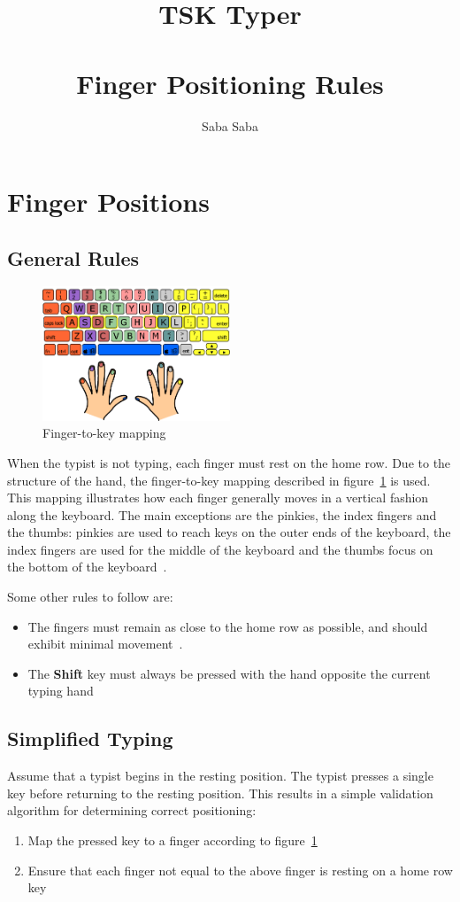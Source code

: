 \documentclass[12pt, letterpaper, titlepage]{article}
\author{Saba Saba}
\title{\textbf{TSK Typer} \\
\hrulefill \\
Finger Positioning Rules}
\begin{document}
\maketitle

\tableofcontents
\newpage
\listoffigures
\newpage

\section{Finger Positions}
\subsection{General Rules}
\begin{figure}[h]
\centering
\includegraphics[width=0.5\textwidth]{which_fingers.png}
\caption{Finger-to-key mapping~\cite{hudson.misc}}
\label{Mapping}
\end{figure}
When the typist is not typing, each finger must rest on the home row.
Due to the structure of the hand, the finger-to-key mapping described in figure~\ref{Mapping} is used.
This mapping illustrates how each finger generally moves in a vertical fashion along the keyboard.
The main exceptions are the pinkies, the index fingers and the thumbs:
pinkies are used to reach keys on the outer ends of the keyboard, the index fingers are used for the middle of the keyboard and the thumbs focus on the bottom of the keyboard~\cite{hudson.misc}.

Some other rules to follow are:
\begin{itemize}
\item The fingers must remain as close to the home row as possible, and should exhibit minimal movement~\cite{rapid.misc}.
\item The \textbf{Shift} key must always be pressed with the hand opposite the current typing hand~\cite{rapid.misc}
\end{itemize}

\subsection{Simplified Typing}
\label{simplified}
Assume that a typist begins in the resting position.
The typist presses a single key before returning to the resting position.
This results in a simple validation algorithm for determining correct positioning:
\begin{enumerate}
\item Map the pressed key to a finger according to figure~\ref{Mapping}
\item Ensure that each finger not equal to the above finger is resting on a home row key
\end{enumerate}
\end{document}
